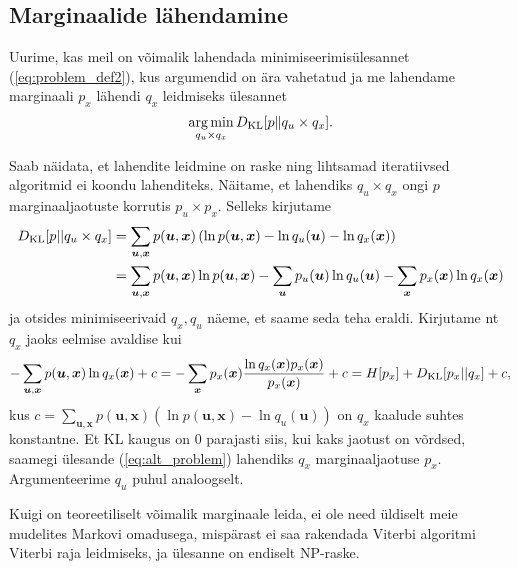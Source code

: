 \subsection{Marginaalide lähendamine}\label{sec:theory_approximating_marginals}

Uurime, kas meil on võimalik lahendada minimiseerimisülesannet (\ref{eq:problem_def2}), kus argumendid on ära vahetatud ja me lahendame marginaali $p_x$ lähendi $q_x$ leidmiseks ülesannet
\begin{equation}
    \label{eq:alt_problem}
    \operatorname*{arg\,min}_{q_u \times q_x}D_{\mathrm{KL}}[p \| q_u \times q_x].
\end{equation}

Saab näidata, et lahendite leidmine on raske ning lihtsamad iteratiivsed algoritmid ei koondu lahenditeks. Näitame, et lahendiks $q_u \times q_x$ ongi $p$ marginaaljaotuste korrutis $p_u \times p_x$. Selleks kirjutame
\begin{align*}
    D_{\mathrm{KL}}[p || q_u \times q_x] &= \sum_{\bm{u}, \bm{x}} p(\bm{u},\bm{x}) \left( \ln p(\bm{u},\bm{x}) - \ln q_u(\bm{u}) - \ln q_x(\bm{x}) \right) \\
    &= \sum_{\bm{u}, \bm{x}} p(\bm{u},\bm{x}) \ln p(\bm{u},\bm{x}) - \sum_{\bm{u}} p_u(\bm{u})  \ln q_u(\bm{u}) -  \sum_{\bm{x}} p_x(\bm{x})\ln q_x(\bm{x})
\end{align*}
ja otsides minimiseerivaid $q_x, q_u$ näeme, et saame seda teha eraldi. Kirjutame nt $q_x$ jaoks eelmise avaldise kui
$$
-\sum_{\bm{u}, \bm{x}} p(\bm{u},\bm{x}) \ln q_x(\bm{x}) + c = -\sum_{\bm{x}} p_x(\bm{x}) \frac{\ln q_x(\bm{x}) p_x(\bm{x})}{p_x(\bm{x})} + c= H[p_x] + D_{\mathrm{KL}}[p_x||q_x] + c,
$$
kus $c =  \sum_{\bm{u}, \bm{x}} p(\bm{u},\bm{x}) \left( \ln p(\bm{u},\bm{x}) - \ln q_u(\bm{u}) \right)$ on $q_x$ kaalude suhtes konstantne.
Et KL kaugus on $0$ parajasti siis, kui kaks jaotust on võrdsed, saamegi ülesande (\ref{eq:alt_problem}) lahendiks $q_x$ marginaaljaotuse $p_x$. Argumenteerime $q_u$ puhul analoogselt. 

Kuigi on teoreetiliselt võimalik marginaale leida, ei ole need üldiselt meie mudelites Markovi omadusega, mispärast ei saa rakendada Viterbi algoritmi Viterbi raja leidmiseks, ja ülesanne on endiselt NP-raske. 


